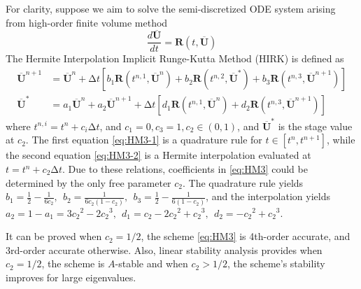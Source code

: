 \documentclass[10pt]{article}
\newcommand{\uu}{\overline{\mathbf{U}}}
\newcommand{\R}{\mathbf{R}}
\newcommand{\inc}{\mathrm\Delta}
\begin{document}
For clarity, suppose we aim to solve
the semi-discretized ODE system arising from high-order
finite volume method
\begin{equation}
  \frac{d\uu}{dt} = \R(t, \uu)
\end{equation}
The Hermite Interpolation Implicit Runge-Kutta Method (HIRK)
is defined as
\begin{subequations}
  \label{eq:HM3}
  \begin{align}
    \uu^{n+1} & = \uu^{n} +
    \inc t
    \left[
      b_1\R(t^{n,1}, \uu^n) +
      b_2\R(t^{n,2}, \uu^*) +
      b_3\R(t^{n,3}, \uu^{n+1})
    \right]   \label{eq:HM3-1} \\
    \uu^{*}   & =
    a_1\uu^{n} +
    a_2\uu^{n+1} +
    \inc t
    \left[
      d_1\R(t^{n,1}, \uu^n) +
      d_2\R(t^{n,3}, \uu^{n+1})
      \right] \label{eq:HM3-2}
  \end{align}
\end{subequations}
where $t^{n,i}=t^n+c_i\inc t$, and $c_1 = 0, c_3 = 1, c_2\in(0,1)$,
and $\uu^*$ is the stage value at $c_2$.
The first equation \eqref{eq:HM3-1} is
a quadrature rule for $t\in[t^n,t^{n+1}]$,
while the second equation \eqref{eq:HM3-2} is a Hermite interpolation
evaluated at $t=t^n + c_2\inc t$.
Due to these relations, coefficients in \eqref{eq:HM3}
could be determined by the only free parameter $c_2$.
The quadrature rule yields
\(
b_1  = \frac{1}{2} - \frac{1}{6{c_2}},\ \
b_2  = \frac{1}{6{c_2}(1-{c_2})},\ \
b_3  = \frac{1}{2} - \frac{1}{6(1-{c_2})}
\),
and the interpolation yields
\(
a_2 = 1 - a_1 = 3{c_2}^2 - 2 {c_2}^3,\ \
d_1  = {c_2} - 2 {c_2}^2 + {c_2}^3   ,\ \
d_2  = - {c_2}^2 + {c_2}^3
\).

It can be proved when $c_2=1/2$, the scheme \eqref{eq:HM3}
is 4th-order accurate, and 3rd-order accurate otherwise.
Also, linear stability analysis provides when $c_2=1/2$, the
scheme is $A$-stable and when $c_2>1/2$, the scheme's
stability improves for large eigenvalues.
\end{document}
